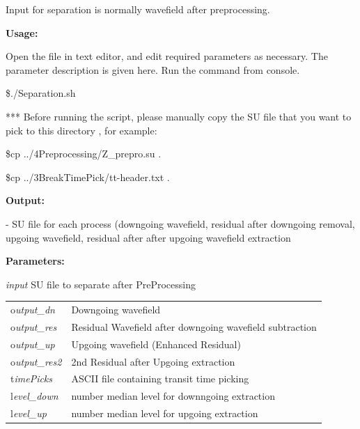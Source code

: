 \documentclass{article}
\begin{document}
\vspace{1pt}
Input for separation is normally wavefield after preprocessing.

\vspace{4pt}
\textbf{Usage:}

\vspace{4pt}
Open the file in text editor, and edit required parameters as necessary. The parameter 
description is given here. Run the command from console. 

\vspace{4pt}
\$./Separation.sh 

\vspace{16pt}
*** Before running the script, please manually copy the SU file that you want to 
pick to this directory , for example:

\vspace{4pt}
\$cp ../4Preprocessing/Z\_prepro.su .

\vspace{4pt}
\$cp ../3BreakTimePick/tt-header.txt .

\vspace{16pt}
\textbf{Output:}

\vspace{4pt}
- SU file for each process (downgoing wavefield, residual after downgoing removal, 
upgoing wavefield, residual after after upgoing wavefield extraction

\vspace{16pt}
\textbf{Parameters:}

\vspace{4pt}
\textit{input} SU file to separate after PreProcessing 

\vspace{4pt}
\begin{tabular}{|>{\raggedright}p{54pt}|>{\raggedright}p{245pt}|}
\hline
\tabularnewline
\hline
o\textit{utput\_dn}  & Downgoing wavefield \tabularnewline
\hline
o\textit{utput\_res}  & Residual Wavefield after downgoing wavefield subtraction 
\tabularnewline
\hline
o\textit{utput\_up}  & Upgoing wavefield (Enhanced Residual) \tabularnewline
\hline
o\textit{utput\_res2}  & 2nd Residual after Upgoing extraction \tabularnewline
\hline
t\textit{imePicks}  & ASCII file containing transit time picking \tabularnewline
\hline
l\textit{evel\_down}  & number median level for downngoing extraction \tabularnewline
\hline
l\textit{evel\_up}  & number median level for upgoing extraction \tabularnewline
\hline
\end{tabular}
\end{document}
